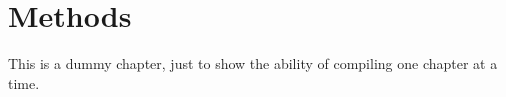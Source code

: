 \chapter{Methods}
This is a dummy chapter, just to show the ability of compiling one chapter at a time.
